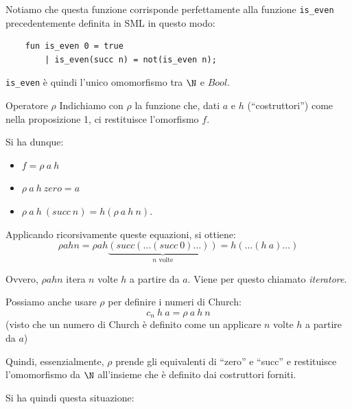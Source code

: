 \documentclass[a4paper,11pt]{report}
\begin{document}
Notiamo che questa funzione corrisponde perfettamente alla funzione \texttt{is\_even} precedentemente definita in SML in questo modo:
\begin{lstlisting}
    fun is_even 0 = true
        | is_even(succ n) = not(is_even n);
\end{lstlisting}

\texttt{is\_even} è quindi l'unico omomorfismo tra \( \N \) e \(Bool\).

\begin{defframe}{Operatore \( \rho \)}{}
Indichiamo con \( \rho \) la funzione che, dati \( a \) e \( h \) (``costruttori'') come nella proposizione 1,  ci restituisce l'omorfismo \( f \). 

Si ha dunque:
\begin{itemize}
    \item \( f = \rho \ a \ h \)
    \item \( \rho \ a \ h \ zero = a \)
    \item \( \rho \ a \ h \ (succ \ n) = h(\rho \ a \ h \ n) \).
\end{itemize}

        Applicando ricorsivamente queste equazioni, si ottiene:
        \[ \rho a h n = \rho a h \underbrace{(succ(\ldots(succ\ 0)\ldots))}_{n \text{ volte}} = h(\ldots(h\ a)\ldots) \]
        
Ovvero, \(  \rho a h n \) itera \( n \) volte \( h \) a partire da \( a \). Viene per questo chiamato \textit{iteratore}.
\begin{gframe}{}
Possiamo anche usare \( \rho \) per definire i numeri di Church:
\[ c_n \ h \ a = \rho \ a \ h \ n \]
{\color{gray}(visto che un numero di Church è definito come un applicare \( n \) volte \( h \) a partire da \( a \))}
\end{gframe}
\end{defframe}

{\color{CadetBlue}\small Quindi, essenzialmente, \( \rho \) prende gli equivalenti di ``zero'' e ``succ'' e restituisce l'omomorfismo da \( \N \) all'insieme che è definito dai costruttori forniti.}

\begin{centering}
Si ha quindi questa situazione:


\end{centering}
\end{document}

